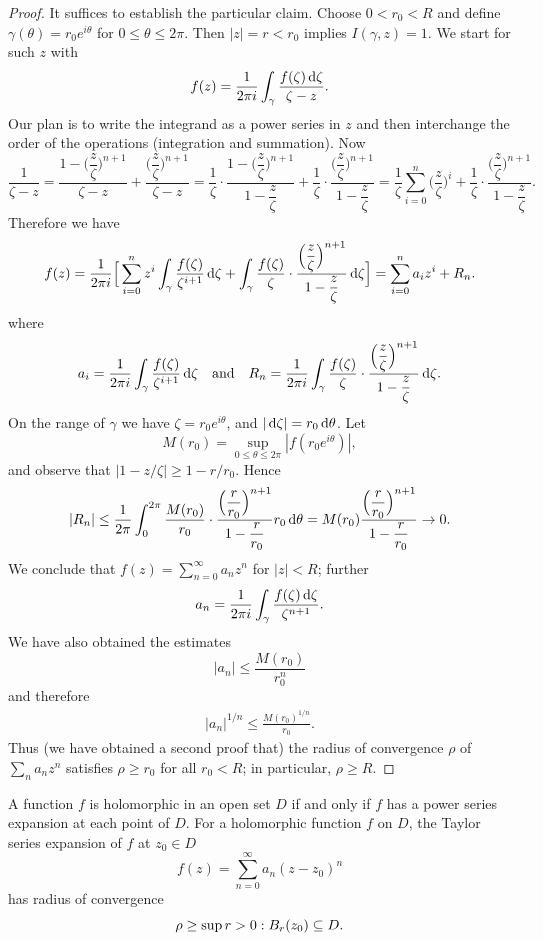 \begin{proof}
It suffices to establish the particular claim. Choose $0<r_0<R$ and define $\gamma(\theta)=r_0e^{i\theta}$ for $0\leq\theta\leq 2\pi$. Then $|z|=r<r_0$ implies $I(\gamma,z)=1$. We start for such $z$ with
\[f(z)=\frac{1}{2\pi i}\int_{\gamma}\frac{f(\zeta)\mathop{}\!\mathrm{d}\zeta}{\zeta-z}.\]
Our plan is to write the integrand as a power series in $z$ and then interchange the order of the operations (integration and summation). Now
\[\frac{1}{\zeta-z}=\frac{1-\Big(\dfrac{z}{\zeta}\Big)^{n+1}}{\zeta-z}+\frac{\Big(\dfrac{z}{\zeta}\Big)^{n+1}}{\zeta-z}=\frac{1}{\zeta}\cdot\frac{1-\Big(\dfrac{z}{\zeta}\Big)^{n+1}}{1-\dfrac{z}{\zeta}}+\frac{1}{\zeta}\cdot\frac{\Big(\dfrac{z}{\zeta}\Big)^{n+1}}{1-\dfrac{z}{\zeta}}=\frac{1}{\zeta}\sum_{i=0}^{n}\Big(\frac{z}{\zeta}\Big)^i+\frac{1}{\zeta}\cdot\frac{\Big(\dfrac{z}{\zeta}\Big)^{n+1}}{1-\dfrac{z}{\zeta}}.\]
Therefore we have
\[f(z)=\frac{1}{2\pi i}\Big[\sum_{i=0}^{n}z^i\int_{\gamma}\frac{f(\zeta)}{\zeta^{i+1}}\mathop{}\!\mathrm{d}\zeta+\int_{\gamma}\frac{f(\zeta)}{\zeta}\cdot\frac{\Big(\dfrac{z}{\zeta}\Big)^{n+1}}{1-\dfrac{z}{\zeta}}\mathop{}\!\mathrm{d}\zeta\Big]=\sum_{i=0}^{n}a_iz^i+R_n.\]
where
\[a_i=\frac{1}{2\pi i}\int_{\gamma}\frac{f(\zeta)}{\zeta^{i+1}}\mathop{}\!\mathrm{d}\zeta\quad\text{and}\quad R_n=\frac{1}{2\pi i}\int_{\gamma}\frac{f(\zeta)}{\zeta}\cdot\frac{\Big(\dfrac{z}{\zeta}\Big)^{n+1}}{1-\dfrac{z}{\zeta}}\mathop{}\!\mathrm{d}\zeta.\]
On the range of $\gamma$ we have $\zeta=r_0e^{i\theta}$, and $|\mathop{}\!\mathrm{d}\zeta|=r_0\mathop{}\!\mathrm{d}\theta$. Let
\[M(r_0)=\sup_{0\leq\theta\leq 2\pi}|f(r_0e^{i\theta})|,\]
and observe that $|1-z/\zeta|\geq 1-r/r_0$. Hence
\begin{align*}
|R_n|\leq\frac{1}{2\pi}\int_{0}^{2\pi}\frac{M(r_0)}{r_0}\cdot\frac{\Big(\dfrac{r}{r_0}\Big)^{n+1}}{1-\dfrac{r}{r_0}}r_0\mathop{}\!\mathrm{d}\theta=M(r_0)\frac{\Big(\dfrac{r}{r_0}\Big)^{n+1}}{1-\dfrac{r}{r_0}}\to 0.
\end{align*}
We conclude that $f(z)=\sum_{n=0}^{\infty}a_nz^n$ for $|z|<R$; further
\[a_n=\frac{1}{2\pi i}\int_{\gamma}\frac{f(\zeta)\mathop{}\!\mathrm{d}\zeta}{\zeta^{n+1}}.\]
We have also obtained the estimates
\[|a_n|\leq\frac{M(r_0)}{r_0^n}\]
and therefore
\begin{align}\label{holomorphic power expansion coefficient extimate}
|a_n|^{1/n}\leq\frac{M(r_0)^{1/n}}{r_0}.
\end{align}
Thus (we have obtained a second proof that) the radius of convergence $\rho$ of $\sum_{n}a_nz^n$ satisfies $\rho\geq r_0$ for all $r_0<R$; in particular, $\rho\geq R$.
\end{proof}
\begin{corollary}
A function $f$ is holomorphic in an open set $D$ if and only if $f$ has a power series expansion at each point of $D$. For a holomorphic function $f$ on $D$, the Taylor series expansion of $f$ at $z_0\in D$
\[f(z)=\sum_{n=0}^{\infty}a_n(z-z_0)^n\]
has radius of convergence
\[\rho\geq\sup{r>0:B_r(z_0)\subseteq D}.\]
\end{corollary}
